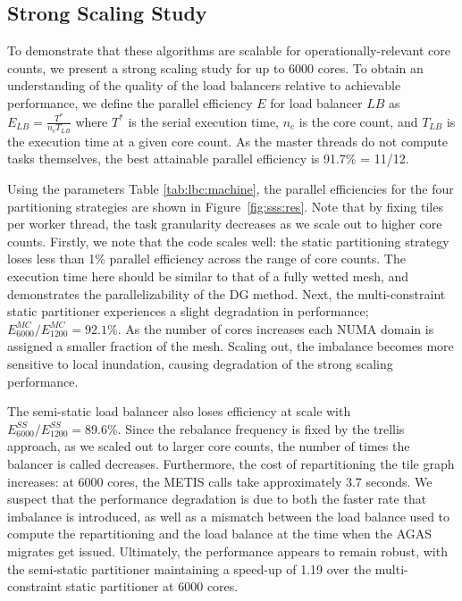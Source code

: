 \subsection{Strong Scaling Study}
To demonstrate that these algorithms are scalable for operationally-relevant core counts, we present a strong scaling study for up to 6000 cores. 
To obtain an understanding of the quality of the load balancers relative to achievable performance, we define the parallel efficiency $E$ for load balancer $LB$ as $E_{LB} = \frac{ T^*}{n_c T_{LB}}$ where $T^*$ is the serial execution time, $n_c$ is the core count, and $T_{LB}$ is the execution time at a given core count. As the master threads do not compute tasks themselves, the best attainable parallel efficiency is 91.7\% = 11/12.

Using the parameters Table \ref{tab:lbc:machine}, the parallel efficiencies for the four partitioning strategies are shown in Figure~\ref{fig:sss:res}. Note that by fixing  tiles per worker thread, the task granularity decreases as we scale out to higher core counts.
Firstly, we note that the code scales well: the static partitioning strategy loses less than 1\% parallel efficiency across the range of core counts. The execution time here should be similar to that of a fully wetted mesh, and demonstrates the parallelizability of the DG method. Next, the multi-constraint static partitioner experiences a slight degradation in performance; $E^{MC}_{6000}/E^{MC}_{1200} = 92.1 \%$. As the number of cores increases each NUMA domain is assigned a smaller fraction of the mesh. Scaling out, the imbalance becomes more sensitive to local inundation, causing degradation of the strong scaling performance.

The semi-static load balancer also loses efficiency at scale with $E^{SS}_{6000}/E^{SS}_{1200}=89.6\%$. Since the rebalance frequency is fixed by the trellis approach, as we scaled out to larger core counts, the number of times the balancer is called decreases. Furthermore, the cost of repartitioning the tile graph increases: at 6000 cores, the METIS calls take approximately 3.7 seconds. We suspect that the performance degradation is due to both the faster rate that imbalance is introduced, as well as a mismatch between the load balance used to compute the repartitioning and the load balance at the time when the AGAS migrates get issued.  Ultimately, the performance appears to remain robust, with the semi-static partitioner maintaining a speed-up of 1.19 over the multi-constraint static partitioner at 6000 cores.

